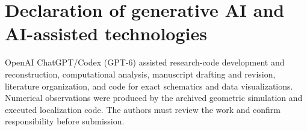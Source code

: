 \documentclass[final,3p,times]{elsarticle}
\begin{document}
\section*{Declaration of generative AI and AI-assisted technologies}
OpenAI ChatGPT/Codex (GPT-6) assisted research-code development and reconstruction, computational analysis, manuscript drafting and revision, literature organization, and code for exact schematics and data visualizations. Numerical observations were produced by the archived geometric simulation and executed localization code. The authors must review the work and confirm responsibility before submission.


\FloatBarrier
\end{document}

